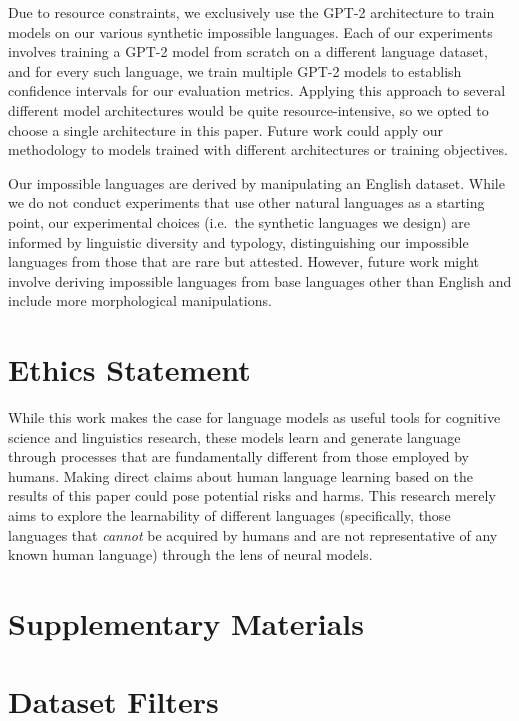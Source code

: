 \documentclass[11pt]{article}
\begin{document}
Due to resource constraints, we exclusively use the GPT-2 architecture to train models on our various synthetic impossible languages. Each of our experiments involves training a GPT-2 model from scratch on a different language dataset, and for every such language, we train multiple GPT-2 models to establish confidence intervals for our evaluation metrics. Applying this approach to several different model architectures would be quite resource-intensive, so we opted to choose a single architecture in this paper. Future work could apply our methodology to models trained with different architectures or training objectives.

Our impossible languages are derived by manipulating an English dataset. While we do not conduct experiments that use other natural languages as a starting point, our experimental choices (i.e.\ the synthetic languages we design) are informed by linguistic diversity and typology, distinguishing our impossible languages from those that are rare but attested. However, future work might involve deriving impossible languages from base languages other than English and include more morphological manipulations.

\section{Ethics Statement}

While this work makes the case for language models as useful tools for cognitive science and linguistics research, these models learn and generate language through processes that are fundamentally different from those employed by humans. Making direct claims about human language learning based on the results of this paper could pose potential risks and harms. This research merely aims to explore the learnability of different languages (specifically, those languages that \emph{cannot} be acquired by humans and are not representative of any known human language) through the lens of neural models. 




\newpage

\appendix

\section*{Supplementary Materials}

\section{Dataset Filters} \label{sec:appendix-dataset-filters}
\end{document}
